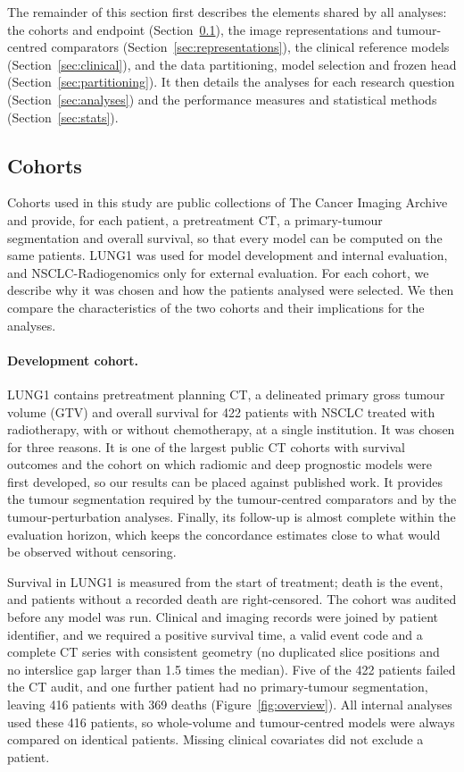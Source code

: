\tabDesign

The remainder of this section first describes the elements shared by all analyses: the cohorts and endpoint (Section~\ref{sec:cohorts}), the image representations and tumour-centred comparators (Section~\ref{sec:representations}), the clinical reference models (Section~\ref{sec:clinical}), and the data partitioning, model selection and frozen head (Section~\ref{sec:partitioning}). It then details the analyses for each research question (Section~\ref{sec:analyses}) and the performance measures and statistical methods (Section~\ref{sec:stats}).

\subsection{Cohorts}\label{sec:cohorts}
Cohorts used in this study are public collections of The Cancer Imaging Archive and provide, for each patient, a pretreatment CT, a primary-tumour segmentation and overall survival, so that every model can be computed on the same patients. LUNG1 was used for model development and internal evaluation, and NSCLC-Radiogenomics only for external evaluation. For each cohort, we describe why it was chosen and how the patients analysed were selected. We then compare the characteristics of the two cohorts and their implications for the analyses.

\paragraph{Development cohort.} LUNG1 contains pretreatment planning CT, a delineated primary gross tumour volume (GTV) and overall survival for 422 patients with NSCLC treated with radiotherapy, with or without chemotherapy, at a single institution.\cite{aerts2014,tciaLung1} It was chosen for three reasons. It is one of the largest public CT cohorts with survival outcomes and the cohort on which radiomic and deep prognostic models were first developed,\cite{aerts2014,hosny2018} so our results can be placed against published work. It provides the tumour segmentation required by the tumour-centred comparators and by the tumour-perturbation analyses. Finally, its follow-up is almost complete within the evaluation horizon, which keeps the concordance estimates close to what would be observed without censoring.

Survival in LUNG1 is measured from the start of treatment; death is the event, and patients without a recorded death are right-censored. The cohort was audited before any model was run. Clinical and imaging records were joined by patient identifier, and we required a positive survival time, a valid event code and a complete CT series with consistent geometry (no duplicated slice positions and no interslice gap larger than 1.5 times the median). Five of the 422 patients failed the CT audit, and one further patient had no primary-tumour segmentation, leaving 416 patients with 369 deaths (Figure~\ref{fig:overview}). All internal analyses used these 416 patients, so whole-volume and tumour-centred models were always compared on identical patients. Missing clinical covariates did not exclude a patient.

